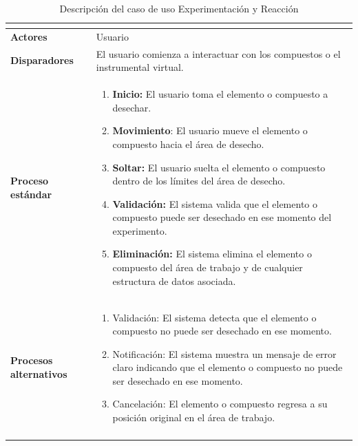 \begin{longtable}{>{\raggedright\arraybackslash}m{} >{\raggedright\arraybackslash}m{}}
\begin{itemize}
    \end{itemize}\\
    \midrule
    \textbf{Actores} & Usuario \\
    \midrule
    \textbf{Disparadores} &  El usuario comienza a interactuar con los compuestos o el instrumental virtual.\\
    \midrule
    \textbf{Proceso estándar} &
    \begin{enumerate}
        \item \textbf{Inicio:} El usuario toma el elemento o compuesto a desechar.
        \item \textbf{Movimiento}: El usuario mueve el elemento o compuesto hacia el área de desecho.
        \item \textbf{Soltar:} El usuario suelta el elemento o compuesto dentro de los límites del área de desecho.
        \item \textbf{Validación:} El sistema valida que el elemento o compuesto puede ser desechado en ese momento del experimento.
        \item \textbf{Eliminación:} El sistema elimina el elemento o compuesto del área de trabajo y de cualquier estructura de datos asociada.
    \end{enumerate} \\
    \midrule
    \textbf{Procesos alternativos} & 
    \begin{enumerate}[{4}A. ]
        \item Validación: El sistema detecta que el elemento o compuesto no puede ser desechado en ese momento.
        \item Notificación: El sistema muestra un mensaje de error claro indicando que el elemento o compuesto no puede ser desechado en ese momento.
        \item Cancelación: El elemento o compuesto regresa a su posición original en el área de trabajo.
    \end{enumerate}\\
    \midrule
    \caption{Descripción del caso de uso Experimentación y Reacción}
    \label{tab:Caso_de_uso_ Balancear_Experimentación_y_Reacción}
\end{longtable}

